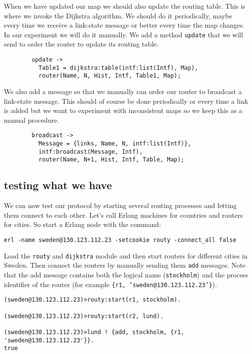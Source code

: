 \documentclass[a4paper, 11pt]{article}
\begin{document}
\noindent When we have updated our map we should also update the routing
table. This is where we invoke the Dijkstra algorithm. We should do it
periodically, maybe every time we receive a link-state message or
better every time the map changes. In our experiment we will do it
manually. We add a method {\tt update} that we will send to order the
router to update its routing table.

\begin{verbatim}
        update ->
          Table1 = dijkstra:table(intf:list(Intf), Map),
          router(Name, N, Hist, Intf, Table1, Map);
\end{verbatim}

\noindent We also add a message so that we manually can order our router to
broadcast a link-state message. This should of course be done
periodically or every time a link is added but we want to experiment
with inconsistent maps so we keep this as a manual procedure.

\begin{verbatim}
        broadcast ->
          Message = {links, Name, N, intf:list(Intf)},
          intf:broadcast(Message, Intf),
          router(Name, N+1, Hist, Intf, Table, Map);       
\end{verbatim}


\subsection{testing what we have}

We can now test our protocol by starting several routing processes and
letting them connect to each other. Let's call Erlang machines for countries
and routers for cities. So start a Erlang node with the command:

\begin{verbatim}
erl -name sweden@130.123.112.23 -setcookie routy -connect_all false
\end{verbatim}

Load the {\tt routy} and {\tt dijkstra} module and then start routers
for different cities in Sweden. Then connect the routers by manually
sending them {\tt add} messages. Note that the add message contains
both the logical name ({\tt stockholm}) and the process identifier of
the router (for example {\tt \{r1, 'sweden@130.123.112.23'\}}).

\begin{verbatim}
(sweden@130.123.112.23)>routy:start(r1, stockholm).

(sweden@130.123.112.23)>routy:start(r2, lund).

(sweden@130.123.112.23)>lund ! {add, stockholm, {r1, 'sweden@130.123.112.23'}}.
true
\end{verbatim}
\end{document}
